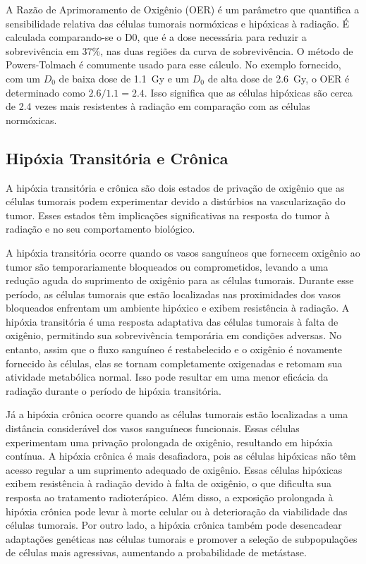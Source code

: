 \documentclass[11pt,a4paper]{article}
\newcounter{exemplo}
\begin{document}
	A Razão de Aprimoramento de Oxigênio (OER) é um parâmetro que quantifica a sensibilidade relativa das células tumorais normóxicas e hipóxicas à radiação. É calculada comparando-se o D0, que é a dose necessária para reduzir a sobrevivência em 37\%, nas duas regiões da curva de sobrevivência. O método de Powers-Tolmach é comumente usado para esse cálculo. No exemplo fornecido, com um $D_0$ de baixa dose de \SI{1.1}{\gray} e um $D_0$ de alta dose de \SI{2.6}{\gray}, o OER é determinado como $2.6/1.1 = 2.4$. Isso significa que as células hipóxicas são cerca de 2.4 vezes mais resistentes à radiação em comparação com as células normóxicas.

\subsection*{Hipóxia Transitória e Crônica}

	A hipóxia transitória e crônica são dois estados de privação de oxigênio que as células tumorais podem experimentar devido a distúrbios na vascularização do tumor. Esses estados têm implicações significativas na resposta do tumor à radiação e no seu comportamento biológico.

	A hipóxia transitória ocorre quando os vasos sanguíneos que fornecem oxigênio ao tumor são temporariamente bloqueados ou comprometidos, levando a uma redução aguda do suprimento de oxigênio para as células tumorais. Durante esse período, as células tumorais que estão localizadas nas proximidades dos vasos bloqueados enfrentam um ambiente hipóxico e exibem resistência à radiação. A hipóxia transitória é uma resposta adaptativa das células tumorais à falta de oxigênio, permitindo sua sobrevivência temporária em condições adversas. No entanto, assim que o fluxo sanguíneo é restabelecido e o oxigênio é novamente fornecido às células, elas se tornam completamente oxigenadas e retomam sua atividade metabólica normal. Isso pode resultar em uma menor eficácia da radiação durante o período de hipóxia transitória.

	Já a hipóxia crônica ocorre quando as células tumorais estão localizadas a uma distância considerável dos vasos sanguíneos funcionais. Essas células experimentam uma privação prolongada de oxigênio, resultando em hipóxia contínua. A hipóxia crônica é mais desafiadora, pois as células hipóxicas não têm acesso regular a um suprimento adequado de oxigênio. Essas células hipóxicas exibem resistência à radiação devido à falta de oxigênio, o que dificulta sua resposta ao tratamento radioterápico. Além disso, a exposição prolongada à hipóxia crônica pode levar à morte celular ou à deterioração da viabilidade das células tumorais. Por outro lado, a hipóxia crônica também pode desencadear adaptações genéticas nas células tumorais e promover a seleção de subpopulações de células mais agressivas, aumentando a probabilidade de metástase.
\end{document}
